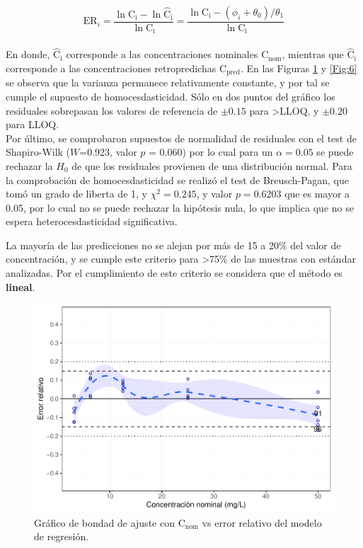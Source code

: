 \documentclass{article}
\begin{document}
\begin{equation}\label{Eq:1}
	\mathrm{ER}_{i} = \frac{\ln{\mathrm{C_{i}}} - \ln{\mathrm{\hat{C}_{i}}}}{\ln{\mathrm{C_{i}}}} = \frac{\ln{\mathrm{C_{i}}} - \left(\phi_{i} + \theta_{0}\right) / \theta_{1}}{\ln{\mathrm{C_{i}}}}
\end{equation} \\

\noindent
En donde, $ \mathrm{\hat{C}_{i}} $ corresponde a las concentraciones nominales $ \mathrm{C_{nom}} $, mientras que $ \mathrm{\hat{C}_{i}} $ corresponde a las concentraciones retropredichas $ \mathrm{C_{pred}} $. En las Figuras \ref{Fig:5} y \ref{Fig:6} se observa que la varianza permanece relativamente constante, y por tal se cumple el supuesto de homocesdasticidad. Sólo en dos puntos del gráfico los residuales sobrepasan los valores de referencia de $\pm 0.15$ para >LLOQ, y $\pm 0.20$ para LLOQ.\\

\noindent
Por último, se comprobaron supuestos de normalidad de residuales con el test de Shapiro-Wilk ($ W $=0.923, valor $ p $ = 0.060) por lo cual para un $ \alpha = 0.05 $ se puede rechazar la $H_{0}$ de que los residuales provienen de una distribución normal. Para la comprobación de homocesdasticidad se realizó el test de Breusch-Pagan, que tomó un grado de liberta de 1, y $\chi^{2} = 0.245$, y valor $p =0.6203$ que es mayor a 0.05, por lo cual no se puede rechazar la hipótesis nula, lo que implica que no se espera heterocesdasticidad significativa.\\

\begin{info}
	La mayoría de las predicciones no se alejan por más de 15 a 20\% del valor de concentración, y se cumple este criterio para >75\% de las muestras con estándar analizadas. Por el cumplimiento de este criterio se considera que el método es \textbf{lineal}. 
\end{info}

\begin{figure}[H]
	\centering
	\includegraphics[width=0.8\linewidth]{Figuras/25_Grafico_error_concentracion.pdf}
	\caption[GOF error vs concentración predicha]{Gráfico de bondad de ajuste con $\mathrm{C_{nom}}$ vs error relativo del modelo de regresión.}
	\label{Fig:5}
\end{figure}
\end{document}
